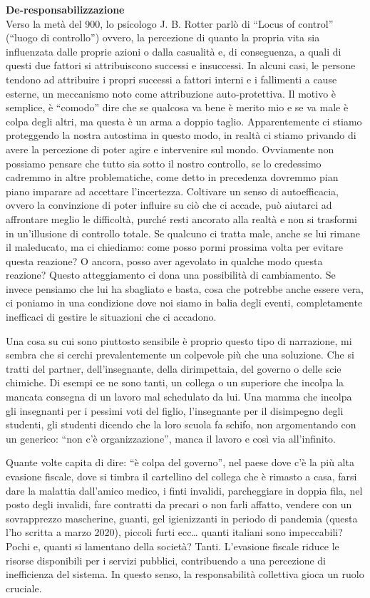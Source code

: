 \documentclass[12pt]{book} %
\begin{document}
\noindent \textbf{\large De-responsabilizzazione} \\
Verso la metà del 900, lo psicologo J. B. Rotter parlò di “Locus of control” (“luogo di controllo”) ovvero, la
percezione di quanto la propria vita sia influenzata dalle proprie azioni o dalla casualità e, di conseguenza, a quali
di questi due fattori si attribuiscono successi e insuccessi. In alcuni casi, le persone tendono ad attribuire i propri successi a fattori interni e i fallimenti a cause esterne, un meccanismo noto come attribuzione auto-protettiva. 
Il motivo è semplice, è “comodo” dire che se qualcosa va bene è merito mio e se va male è colpa
degli altri, ma questa è un arma a doppio taglio. Apparentemente ci stiamo proteggendo la nostra autostima in questo
modo, in realtà ci stiamo privando di avere la percezione di poter agire e intervenire sul mondo. Ovviamente non
possiamo pensare che tutto sia sotto il nostro controllo, se lo credessimo cadremmo in altre problematiche, come
detto in precedenza dovremmo pian piano imparare ad accettare l'incertezza. Coltivare un senso di autoefficacia, ovvero la convinzione di poter influire su ciò che ci accade, può aiutarci ad affrontare meglio le difficoltà, purché resti ancorato alla realtà e non si trasformi in un’illusione di controllo totale. Se qualcuno ci tratta male, anche se lui rimane il maleducato, ma
ci chiediamo: come posso pormi prossima volta per evitare questa reazione? O ancora, posso aver agevolato in qualche
modo questa reazione? Questo atteggiamento ci dona una possibilità di cambiamento. Se invece pensiamo che lui ha
sbagliato e basta, cosa che potrebbe anche essere vera, ci poniamo in una condizione dove noi siamo in balia degli
eventi, completamente inefficaci di gestire le situazioni che ci accadono.

Una cosa su cui sono piuttosto sensibile è proprio questo tipo di narrazione, mi sembra che si cerchi prevalentemente un
colpevole più che una soluzione. Che si tratti del partner, dell'insegnante, della dirimpettaia,
del governo o delle scie chimiche. Di esempi ce ne sono tanti, un collega o un superiore che incolpa la mancata
consegna di un lavoro mal schedulato da lui. Una mamma che incolpa gli insegnanti per i pessimi voti del figlio,
l'insegnante per il disimpegno degli studenti, gli studenti dicendo che la loro scuola fa schifo,
non argomentando con un generico: “non c'è organizzazione”, manca il lavoro e così via
all'infinito.

Quante volte capita di dire: “è colpa del governo”, nel paese dove c'è la più alta evasione
fiscale, dove si timbra il cartellino del collega che è rimasto a casa, farsi dare la malattia
dall'amico medico, i finti invalidi, parcheggiare in doppia fila, nel posto degli invalidi, fare
contratti da precari o non farli affatto, vendere con un sovrapprezzo mascherine, guanti, gel igienizzanti in periodo
di pandemia (questa l'ho scritta a marzo 2020), piccoli furti ecc… quanti italiani sono
impeccabili? Pochi e, quanti si lamentano della società? Tanti. L’evasione fiscale riduce le risorse disponibili per i servizi pubblici, contribuendo a una percezione di inefficienza del sistema. In questo senso, la responsabilità collettiva gioca un ruolo cruciale.
\end{document}

